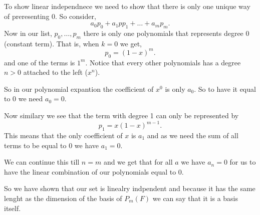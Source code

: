 \documentclass[a4paper]{report}
\begin{document}
To show linear independnece we need to show that there is only one unique way of preresenting 0. So consider, \[
    a_0p_0 + a_1pp_1 + \dots + a_mp_m
.\] 
Now in our list, $p_0, \dots, p_m$ there is only one polynomials that represents degree 0 (constant term). That is, when $k = 0$ we get, \[
p_0 = (1-x)^m
.\] 
and one of the terms is $1^m$. Notice that every other polynomials has a degree $n > 0$ attached to the left ($x^n$).

So in our polynomial expantion the coefficient of $x^0$ is only $a_0$. So to have it equal to $0$ we need  $a_0 = 0$.

Now similary we see that the term with degree 1 can only be represented by \[
    p_1 = x(1-x)^{m - 1}
.\] 
This means that the only coefficient of $x$ is  $a_1$ and as we need the sum of all terms to be equal to 0 we have $a_1 = 0$.

We can continue this till $n = m$ and we get that for all  $a$ we have  $a_n = 0$ for us to have the linear combination of our polynomials equal to 0.

So we have shown that our set is linealry indpendent and because it has the same lenght as the dimension of the basis of  $P_m(F)$ we can say that it is a basis itself.
\end{document}

